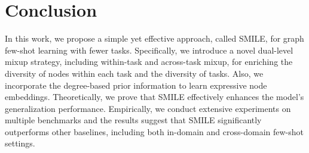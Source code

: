 \section{Conclusion}
In this work, we propose a simple yet effective approach, called SMILE, for graph few-shot learning with fewer tasks. Specifically, we introduce a novel dual-level mixup strategy, including within-task and across-task mixup, for enriching the diversity of nodes within each task and the diversity of tasks. Also, we incorporate the degree-based prior information to learn expressive node embeddings. Theoretically, we prove that SMILE effectively enhances the model's generalization performance. Empirically, we conduct extensive experiments on multiple benchmarks and the results suggest that SMILE significantly outperforms other baselines, including both in-domain and cross-domain few-shot settings.